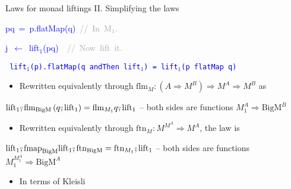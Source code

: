 \documentclass[english]{beamer}
\newenvironment{lyxcode}
  {\par\begin{list}{}{
    \setlength{\rightmargin}{\leftmargin}
    \setlength{\listparindent}{0pt}%
    \raggedright
    \setlength{\itemsep}{0pt}
    \setlength{\parsep}{0pt}
    \normalfont\ttfamily}%
   \def\{{\char`\{}
   \def\}{\char`\}}
   \def\textasciitilde{\char`\~}
   \item[]}
  {\end{list}}
\newcommand{\bef}{\ensuremath\raisebox{2pt}{$\mathsmaller{\mathsmaller{\circ}}$}\hspace{-3.3pt},}
\begin{document}
\begin{frame}{Laws for monad liftings II. Simplifying the laws}
\begin{minipage}[t]{0.5\columnwidth}
\begin{lyxcode}
\textcolor{blue}{\footnotesize{}pq~=~p.flatMap(q)~}\textrm{\textcolor{darkgray}{\footnotesize{}//~In~M$_{1}$.}}{\footnotesize\par}

\textcolor{blue}{\footnotesize{}j~$\leftarrow$~lift$_{1}$(pq)}\textrm{\textcolor{darkgray}{\footnotesize{}~~//~Now~lift~it.}}{\footnotesize\par}
\end{lyxcode}
%
\end{minipage}\texttt{\textcolor{blue}{\footnotesize{}\medskip{}
lift$_{1}$(p).flatMap(q andThen lift$_{1}$) = lift$_{1}$(p flatMap
q)}}{\footnotesize\par}
\begin{itemize}
\item Rewritten equivalently through {\footnotesize{}$\text{flm}_{M}:\left(A\Rightarrow M^{B}\right)\Rightarrow M^{A}\Rightarrow M^{B}$}
as
\end{itemize}
\begin{center}
{\footnotesize{}\vspace{-0.2cm}\hspace{-0.0cm}$\text{lift}_{1}\bef\text{flm}_{\text{BigM}}\left(q\bef\text{lift}_{1}\right)=\text{flm}_{M_{1}}q\bef\text{lift}_{1}$
-- both sides are functions $M_{1}^{A}\Rightarrow\text{BigM}^{B}$}{\footnotesize\par}
\par\end{center}
\begin{itemize}
\item {\footnotesize{}\vspace{-0.3cm}\hspace{-0.0cm}}Rewritten equivalently
through {\footnotesize{}$\text{ftn}_{M}:M^{M^{A}}\Rightarrow M^{A}$,}
the law is
\end{itemize}
\begin{center}
{\footnotesize{}\vspace{-0.2cm}\hspace{-0.0cm}$\text{lift}_{1}\bef\text{fmap}_{\text{BigM}}\text{lift}_{1}\bef\text{ftn}_{\text{BigM}}=\text{ftn}_{M_{1}}\bef\text{lift}_{1}$
-- both sides are functions $M_{1}^{M_{1}^{A}}\Rightarrow\text{BigM}^{A}$}{\footnotesize\par}
\par\end{center}
\begin{itemize}
\item {\footnotesize{}\vspace{-0.3cm}\hspace{-0.0cm}}In terms of Kleisli

\end{itemize}
\end{frame}
\end{document}
